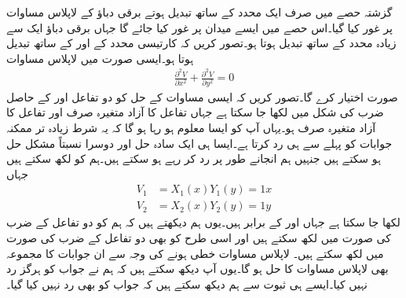 گزشتہ حصے میں صرف ایک محدد کے ساتھ تبدیل ہوتے برقی دباؤ کے لاپلاس مساوات پر غور کیا گیا۔اس حصے میں ایسے میدان پر غور کیا جائے گا جہاں برقی دباؤ ایک سے زیادہ محدد کے ساتھ تبدیل ہوتا ہو۔تصور کریں کہ  کارتیسی محدد کے  اور  کے ساتھ تبدیل ہوتا ہو۔ایسی صورت میں لاپلاس مساوات
\begin{align}\label{مساوات_لاپلاس_ضربی_حل_الف}
\frac{\partial^2 V}{\partial x^2}+\frac{\partial^2 V}{\partial y^2}=0
\end{align}
صورت اختیار کرے گا۔تصور کریں کہ ایسی مساوات کے حل کو دو  تفاعل  اور  کے حاصل ضرب  کی شکل میں لکھا جا سکتا ہے جہاں  تفاعل کا آزاد متغیرہ صرف  اور  تفاعل کا آزاد متغیرہ صرف  ہو۔یہاں آپ کو ایسا معلوم ہو رہا ہو گا کہ یہ شرط زیادہ تر ممکنہ جوابات کو پہلے سے ہی رد کرتا ہے۔ایسا ہی ایک سادہ حل  اور دوسرا نسبتاً مشکل حل   ہو سکتے ہیں جنہیں ہم انجانے طور پر رد کر رہے ہو سکتے ہیں۔ہم  کو  لکھ سکتے ہیں جہاں
\begin{align*}
V_1&=X_1(x) Y_1(y)=1x\\
V_2&=X_2(x) Y_2(y)=1y
\end{align*}
لکھا جا سکتا ہے جہاں  اور  کے برابر ہیں۔یوں ہم دیکھتے ہیں کہ ہم   کو دو تفاعل کے ضرب کی صورت میں لکھ سکتے ہیں اور اسی طرح  کو بھی دو تفاعل کے ضرب کی صورت میں لکھ سکتے ہیں۔ لاپلاس مساوات خطی ہونے کی وجہ سے  ان جوابات کا مجموعہ  بھی لاپلاس مساوات کا حل ہو گا۔یوں آپ دیکھ سکتے ہیں کہ ہم نے  جواب کو ہرگز رد نہیں کیا۔ایسے ہی ثبوت سے ہم دیکھ سکتے ہیں کہ   جواب کو بھی رد نہیں کیا گیا۔

